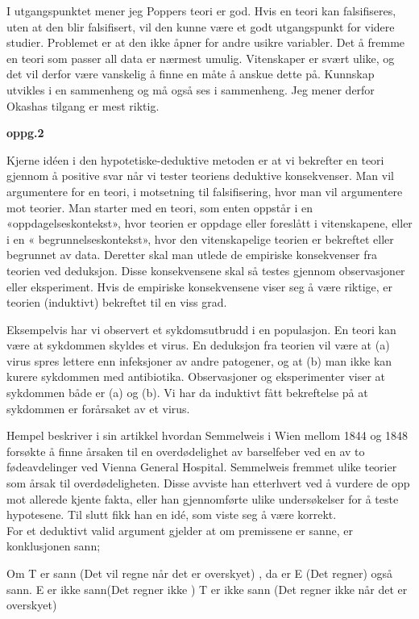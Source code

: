 \documentclass[
  letterpaper,
  DIV=11,
  numbers=noendperiod]{scrreprt}
\begin{document}
I utgangspunktet mener jeg Poppers teori er god. Hvis en teori kan
falsifiseres, uten at den blir falsifisert, vil den kunne være et godt
utgangspunkt for videre studier. Problemet er at den ikke åpner for
andre usikre variabler. Det å fremme en teori som passer all data er
nærmest umulig. Vitenskaper er svært ulike, og det vil derfor være
vanskelig å finne en måte å anskue dette på. Kunnskap utvikles i en
sammenheng og må også ses i sammenheng. Jeg mener derfor Okashas tilgang
er mest riktig.

\textbf{oppg.2}

Kjerne idéen i den hypotetiske-deduktive metoden er at vi bekrefter en
teori gjennom å positive svar når vi tester teoriens deduktive
konsekvenser. Man vil argumentere for en teori, i motsetning til
falsifisering, hvor man vil argumentere mot teorier. Man starter med en
teori, som enten oppstår i en «oppdagelseskontekst», hvor teorien er
oppdage eller foreslått i vitenskapene, eller i en «
begrunnelseskontekst», hvor den vitenskapelige teorien er bekreftet
eller begrunnet av data. Deretter skal man utlede de empiriske
konsekvenser fra teorien ved deduksjon. Disse konsekvensene skal så
testes gjennom observasjoner eller eksperiment. Hvis de empiriske
konsekvensene viser seg å være riktige, er teorien (induktivt) bekreftet
til en viss grad.

Eksempelvis har vi observert et sykdomsutbrudd i en populasjon. En teori
kan være at sykdommen skyldes et virus. En deduksjon fra teorien vil
være at (a) virus spres lettere enn infeksjoner av andre patogener, og
at (b) man ikke kan kurere sykdommen med antibiotika. Observasjoner og
eksperimenter viser at sykdommen både er (a) og (b). Vi har da induktivt
fått bekreftelse på at sykdommen er forårsaket av et virus.

Hempel beskriver i sin artikkel hvordan Semmelweis i Wien mellom 1844 og
1848 forsøkte å finne årsaken til en overdødelighet av barselfeber ved
en av to fødeavdelinger ved Vienna General Hospital. Semmelweis fremmet
ulike teorier som årsak til overdødeligheten. Disse avviste han
etterhvert ved å vurdere de opp mot allerede kjente fakta, eller han
gjennomførte ulike undersøkelser for å teste hypotesene. Til slutt fikk
han en idé, som viste seg å være korrekt.\\

For et deduktivt valid argument gjelder at om premissene er sanne, er
konklusjonen sann;

Om T er sann (Det vil regne når det er overskyet) , da er E (Det regner)
også sann. E er ikke sann(Det regner ikke ) T er ikke sann (Det regner
ikke når det er overskyet)
\end{document}
